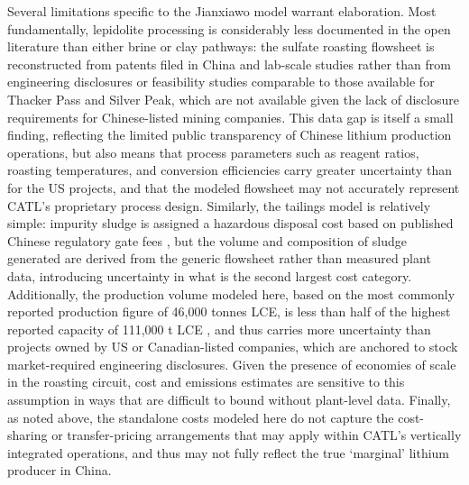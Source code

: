 Several limitations specific to the Jianxiawo model warrant elaboration. Most fundamentally, lepidolite processing is considerably less documented in the open literature than either brine or clay pathways: the sulfate roasting flowsheet is reconstructed from patents filed in China and lab-scale studies \cite{yanExtractionLithiumLepidolite2012, luongFactorsAffectingExtraction2013, parkEffectiveLithiumExtraction2023, dengSystematicReviewSulfate2026, nanMethodsExtractingLithium2022, nanMethodsExtractingLithium2019, zouMethodEfficientLithium2024} rather than from engineering disclosures or feasibility studies comparable to those available for Thacker Pass and Silver Peak, which are not available given the lack of disclosure requirements for Chinese-listed mining companies. This data gap is itself a small finding, reflecting the limited public transparency of Chinese lithium production operations, but also means that process parameters such as reagent ratios, roasting temperatures, and conversion efficiencies carry greater uncertainty than for the US projects, and that the modeled flowsheet may not accurately represent CATL's proprietary process design. Similarly, the tailings model is relatively simple: impurity sludge is assigned a hazardous disposal cost based on published Chinese regulatory gate fees \cite{nationaldevelopmentandreformcommission2024}, but the volume and composition of sludge generated are derived from the generic flowsheet rather than measured plant data, introducing uncertainty in what is the second largest cost category. Additionally, the production volume modeled here, based on the most commonly reported production figure of 46,000 tonnes LCE, is less than half of the highest reported capacity of 111,000 t LCE \cite{benchmarkteamRestartCATLsJianxiawo2026, andrezejewskiResourcesEnergyQuarterly2025}, and thus carries more uncertainty than projects owned by US or Canadian-listed companies, which are anchored to stock market-required engineering disclosures. Given the presence of economies of scale in the roasting circuit, cost and emissions estimates are sensitive to this assumption in ways that are difficult to bound without plant-level data. Finally, as noted above, the standalone costs modeled here do not capture the cost-sharing or transfer-pricing arrangements that may apply within CATL's vertically integrated operations, and thus may not fully reflect the true `marginal' lithium producer in China.

